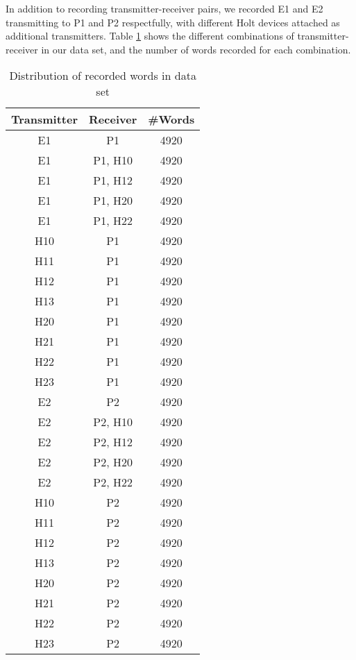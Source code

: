 \documentclass[conference]{IEEEtran}
\begin{document}
  In addition to recording transmitter-receiver pairs, we recorded E1 and E2 transmitting to P1 and P2 respectfully, with different Holt devices attached as additional transmitters. Table \ref{tab:RecordingsSummery} shows the different combinations of transmitter-receiver in our data set, and the number of words recorded for each combination.
  
  \begin{table}
    \caption{Distribution of recorded words in data set}
    \label{tab:RecordingsSummery}
    \centering
    \begin{tabular}{|c c c|} 
      \hline
      Transmitter & Receiver & \#Words \\ [0.5ex] 
      \hline\hline
      E1 & P1 & 4920 \\ %
      \hline
      E1 & P1, H10 & 4920 \\
      \hline
      E1 & P1, H12 & 4920 \\
      \hline
      E1 & P1, H20 & 4920 \\
      \hline
      E1 & P1, H22 & 4920 \\
      \hline
      H10 & P1 & 4920 \\
      \hline
      H11 & P1 & 4920 \\
      \hline
      H12 & P1 & 4920 \\
      \hline
      H13 & P1 & 4920 \\
      \hline
      H20 & P1 & 4920 \\
      \hline
      H21 & P1 & 4920 \\
      \hline
      H22 & P1 & 4920 \\
      \hline
      H23 & P1 & 4920 \\
      \hline
      E2 & P2 & 4920 \\ %
      \hline
      E2 & P2, H10 & 4920 \\
      \hline
      E2 & P2, H12 & 4920 \\
      \hline
      E2 & P2, H20 & 4920 \\
      \hline
      E2 & P2, H22 & 4920 \\
      \hline
      H10 & P2 & 4920 \\
      \hline
      H11 & P2 & 4920 \\
      \hline
      H12 & P2 & 4920 \\
      \hline
      H13 & P2 & 4920 \\
      \hline
      H20 & P2 & 4920 \\
      \hline
      H21 & P2 & 4920 \\
      \hline
      H22 & P2 & 4920 \\
      \hline
      H23 & P2 & 4920 \\
      \hline
    \end{tabular}
  \end{table}
  
\end{document}
